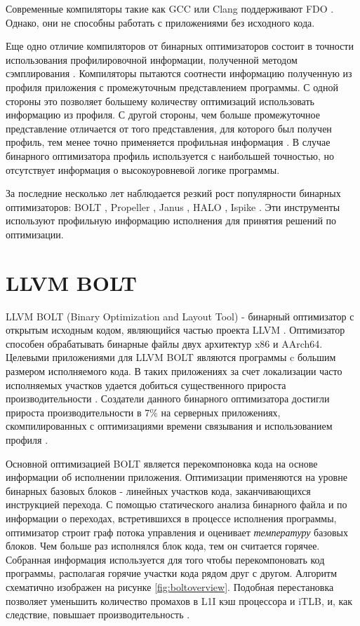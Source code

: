 \documentclass{mipt-thesis-bs}
\begin{document}
    Современные компиляторы такие как GCC или Clang поддерживают FDO \cite{clang-pgo}. Однако, они не способны работать с приложениями без исходного кода.

    Еще одно отличие компиляторов от бинарных оптимизаторов состоит в точности использования профилировочной информации, полученной методом сэмплирования \cite{sample-profiling-accuracy}. Компиляторы пытаются соотнести информацию полученную из профиля приложения с промежуточным представлением программы. С одной стороны это позволяет большему количеству оптимизаций использовать информацию из профиля. С другой стороны, чем больше промежуточное представление отличается от того представления, для которого был получен профиль, тем менее точно применяется профильная информация . В случае бинарного оптимизатора профиль используется с наибольшей точностью, но отсутствует информация о высокоуровневой логике программы.

    За последние несколько лет наблюдается резкий рост популярности бинарных оптимизаторов: BOLT \cite{boltorig}, Propeller \cite{propeller}, Janus \cite{janus}, HALO \cite{halo}, Ispike \cite{ispike}. Эти инструменты используют профильную информацию исполнения для принятия решений по оптимизации.


    \section{LLVM BOLT}
    LLVM BOLT (Binary Optimization and Layout Tool) \cite{boltorig} - бинарный оптимизатор с открытым исходным кодом, являющийся частью проекта LLVM \cite{llvm-framework}. Оптимизатор способен обрабатывать бинарные файлы двух архитектур x86 и AArch64.
    Целевыми приложениями для LLVM BOLT являются программы c большим размером исполняемого кода. В таких приложениях за счет локализации часто исполняемых участков удается добиться существенного прироста производительности \cite{function-placement-optimization}. Создатели данного бинарного оптимизатора достигли прироста производительности в 7\% на серверных приложениях, скомпилированных с оптимизациями времени связывания и использованием профиля \cite{boltorig}.

    Основной оптимизацией BOLT является перекомпоновка кода на основе информации об исполнении приложения. Оптимизации применяются на уровне бинарных базовых блоков - линейных участков кода, заканчивающихся инструкцией перехода. С помощью статического анализа бинарного файла и по информации о переходах, встретившихся в процессе исполнения программы, оптимизатор строит граф потока управления и оценивает \textit{температуру} базовых блоков. Чем больше раз исполнялся блок кода, тем он считается горячее. Собранная информация используется для того чтобы перекомпоновать код программы, располагая горячие участки кода рядом друг с другом. Алгоритм схематично изображен на рисунке \ref{fig:boltoverview}. Подобная перестановка позволяет уменьшить количество промахов в L1I кэш процессора и iTLB, и, как следствие, повышает производительность \cite{pgo-code-positioning}.
\end{document}
